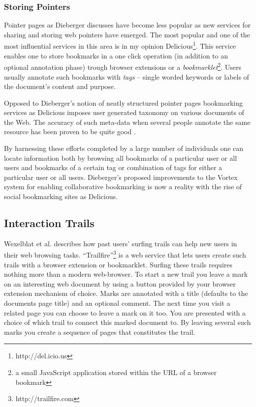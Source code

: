 \documentclass[12pt,a4paper]{article}
\begin{document}
\subsubsection{Storing Pointers}

Pointer pages as Dieberger discusses have become less popular as new services
for sharing and storing web pointers have emerged. The most popular and one of
the most influential services in this area is in my opinion
Delicious\footnote{http://del.icio.us}. This service enables one to store
bookmarks in a one click operation (in addition to an optional annotation
phase) trough browser extensions or a \emph{bookmarklet}\footnote{a small
JavaScript application stored within the URL of a browser bookmark}.
Users usually annotate such bookmarks with \emph{tags} -- single worded
keywords or labels of the document's content and purpose.

Opposed to Dieberger's notion of neatly structured pointer pages
bookmarking services as Delicious imposes user generated taxonomy on various
documents of the Web. The accuracy of such meta-data when several people
annotate the same resource has been proven to be quite good \cite{golder05}.

By harnessing these efforts completed by a large number of individuals one
can locate information both by browsing all
bookmarks of a particular user or all users and bookmarks of a certain tag or
combination of tags for either a particular user or all users.
Dieberger's proposed improvements to the Vortex system for enabling
collaborative bookmarking is now a reality with the rise of social bookmarking
sites as Delicious.




\subsection{Interaction Trails}

Wexelblat et al. describes how past users' surfing trails can help new users
in their web browsing tasks. ``Trailfire''\footnote{http://trailfire.com} is a
web service that lets users create such trails with a browser extension or
bookmarklet. Surfing these trails requires nothing more than a modern
web-browser. To start a new trail you leave a mark on an interesting web
document by using a button provided by your browser extension mechanism of
choice. Marks are annotated with a title (defaults to the documents page
title) and an optional comment. The next time you visit a related page you can
choose to leave a mark on it too. You are presented with a choice of which
trail to connect this marked document to. By leaving several such marks you
create a sequence of pages that constitutes the trail.
\end{document}
